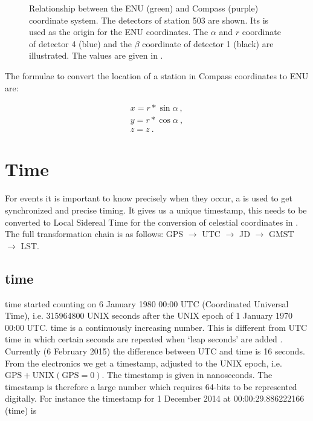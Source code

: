 \begin{figure}
    \centering
    
    \caption{Relationship between the ENU (green) and Compass (purple)
             coordinate system. The detectors of station 503 are shown.
             Its \gps is used as the origin for the ENU coordinates. The
             $\alpha$ and $r$ coordinate of detector 4 (blue) and the
             $\beta$ coordinate of detector 1 (black) are illustrated.
             The values are given in .}
    \label{fig:enu_compass}
\end{figure}

The formulae to convert the location of a station in Compass coordinates
to ENU are:

\begin{equation}
    \begin{array}{l}
        x = r * \sin{\alpha} \ , \\
        y = r * \cos{\alpha} \ , \\
        z = z \ .
    \end{array}
\end{equation}


\section{Time}
\label{sec:time}

For \hisparc events it is important to know precisely when they occur, a
\gps is used to get synchronized and precise timing. It gives us a
unique timestamp, this needs to be converted to Local Sidereal Time for
the conversion of celestial coordinates in . The
full transformation chain is as follows: GPS $\to$ UTC $\to$ JD $\to$
GMST $\to$ LST.


\subsection{\gps time}

\gps time started counting on 6 January 1980 00:00 UTC (Coordinated
Universal Time), i.e. \num{315964800} UNIX seconds after the UNIX epoch
of 1 January 1970 00:00 UTC. \gps time is a continuously increasing
number. This is different from UTC time in which certain seconds are
repeated when `leap seconds' are added \cite{usno:2012aa}. Currently (6
February 2015) the difference between UTC and \gps time is 16 seconds.
From the \hisparc electronics we get a \gps timestamp, adjusted to the
UNIX epoch, i.e. $\mathrm{GPS} + \mathrm{UNIX(GPS=0)}$. The timestamp is
given in nanoseconds. The \gps timestamp is therefore a large number
which requires 64-bits to be represented digitally. For instance the
\gps timestamp for 1 December 2014 at 00:00:29.886222166 (\gps time) is

